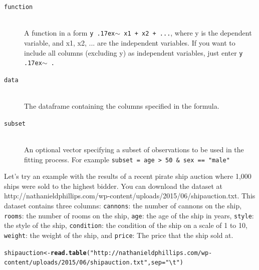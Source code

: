 \documentclass{tufte-book}\usepackage[]{graphicx}\usepackage[]{color}
\makeatletter
\newcommand{\hlstr}[1]{\textcolor[rgb]{0.192,0.494,0.8}{#1}}%
\newcommand{\hlstd}[1]{\textcolor[rgb]{0.345,0.345,0.345}{#1}}%
\newcommand{\hlkwb}[1]{\textcolor[rgb]{0.69,0.353,0.396}{#1}}%
\newcommand{\hlkwc}[1]{\textcolor[rgb]{0.333,0.667,0.333}{#1}}%
\newcommand{\hlkwd}[1]{\textcolor[rgb]{0.737,0.353,0.396}{\textbf{#1}}}%
\newenvironment{kframe}{%
 \def\at@end@of@kframe{}%
 \ifinner\ifhmode%
  \def\at@end@of@kframe{\end{minipage}}%
  \begin{minipage}{\columnwidth}%
 \fi\fi%
 \def\FrameCommand##1{\hskip\@totalleftmargin \hskip-\fboxsep
 \colorbox{shadecolor}{##1}\hskip-\fboxsep
     \hskip-\linewidth \hskip-\@totalleftmargin \hskip\columnwidth}%
 \MakeFramed {\advance\hsize-\width
   \@totalleftmargin\z@ \linewidth\hsize
   \@setminipage}}%
 {\par\unskip\endMakeFramed%
 \at@end@of@kframe}
\newenvironment{knitrout}{}{} %
\makeatother
\begin{document}
\begin{footnotesize}
{{\hline

\begin{description}

\item[\tt{function}] \hfill \\
A function in a form \texttt{y {\raise.17ex\hbox{$\scriptstyle\sim$}} x1 + x2 + ...}, where y is the dependent variable, and x1, x2, ... are the independent variables. If you want to include all columns (excluding y) as independent variables, just enter \texttt{y {\raise.17ex\hbox{$\scriptstyle\sim$}} .}

\item[\tt{data}] \hfill \\
  The dataframe containing the columns specified in the formula.
  
  \item[\tt{subset}] \hfill \\  
An optional vector specifying a subset of observations to be used in the fitting process. For example \texttt{subset = age > 50 & sex == "male"}

\end{description}

}
}
\vspace{5mm} %

Let's try an example with the results of a recent pirate ship auction where 1,000 ships were sold to the highest bidder. You can download the dataset at http://nathanieldphillips.com/wp-content/uploads/2015/06/shipauction.txt. This dataset contains three columns: \texttt{cannons}: the number of cannons on the ship, \texttt{rooms}: the number of rooms on the ship, \texttt{age}: the age of the ship in years, \texttt{style}: the style of the ship, \texttt{condition}: the condition of the ship on a scale of 1 to 10, \texttt{weight}: the weight of the ship, and \texttt{price}: The price that the ship sold at.

\begin{footnotesize}
\begin{knitrout}
\color{fgcolor}\begin{kframe}
\begin{alltt}
\hlstd{shipauction} \hlkwb{<-} \hlkwd{read.table}\hlstd{(}\hlstr{"http://nathanieldphillips.com/wp-content/uploads/2015/06/shipauction.txt"}\hlstd{,} \hlkwc{sep} \hlstd{=} \hlstr{"\textbackslash{}t"}\hlstd{)}
\end{alltt}
\end{kframe}
\end{knitrout}
\end{footnotesize}


\end{footnotesize}
\end{document}
